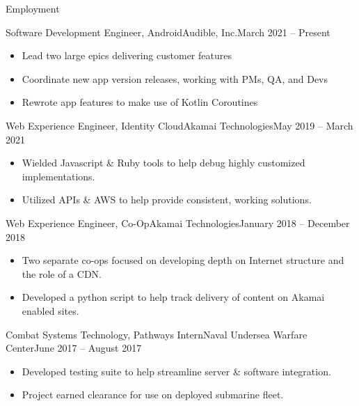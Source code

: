 \documentclass[]{mcdowellcv}
\begin{document}
	\makeheader
	
	\begin{cvsection}{Employment}
		\begin{cvsubsection}{Software Development Engineer, Android}{Audible, Inc.}{March 2021 -- Present}
		\vspace{2mm}
			\begin{itemize}
				\item Lead two large epics delivering customer features
				\item Coordinate new app version releases, working with PMs, QA, and Devs
				\item Rewrote app features to make use of Kotlin Coroutines
			\end{itemize}
		\end{cvsubsection}
		\begin{cvsubsection}{Web Experience Engineer, Identity Cloud}{Akamai Technologies}{May 2019 -- March 2021}
		\vspace{2mm}
			\begin{itemize}
				\item Wielded Javascript \& Ruby tools to help debug highly customized implementations.
				\item Utilized APIs \& AWS to help provide consistent, working solutions.
			\end{itemize}
		\end{cvsubsection}
		
		\begin{cvsubsection}{Web Experience Engineer, Co-Op}{Akamai Technologies}{January 2018 -- December 2018}
		\vspace{2mm}
			\begin{itemize}
				\item Two separate co-ops focused on developing depth on Internet structure and the role of a CDN.
				\item Developed a python script to help track delivery of content on Akamai enabled sites.
			\end{itemize}
		\end{cvsubsection}
		
		\begin{cvsubsection}{Combat Systems Technology, Pathways Intern}{Naval Undersea Warfare Center}{June 2017 -- August 2017}
		\vspace{2mm}
			\begin{itemize}
				\item Developed testing suite to help streamline server \& software integration.
				\item Project earned clearance for use on deployed submarine fleet.
			\end{itemize}
		\end{cvsubsection}
		
	\end{cvsection}
	
\end{document}
